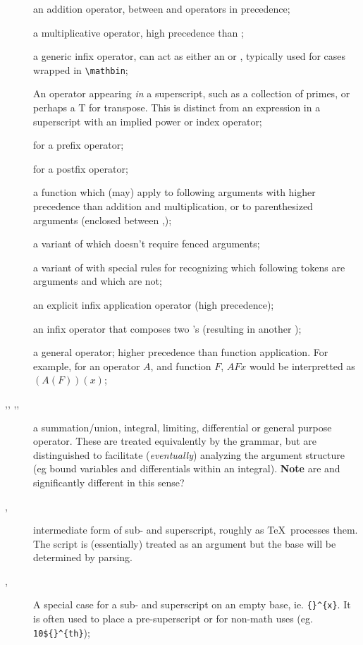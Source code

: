 \documentclass{book}
\begin{document}
\begin{description}
\item[] an addition operator, between  and  operators in
   precedence;
\item[] a multiplicative operator, high precedence than ;
\item[] a generic infix operator, can act as either an  or ,
   typically used for cases wrapped in \verb|\mathbin|;
\item[] An operator appearing \emph{in} a superscript, such as a collection of primes,
  or perhaps a T for transpose. This is distinct from an expression in a superscript with
  an implied power or index operator;

\item[] for a prefix operator;
\item[] for a postfix operator;

\item[] a function which (may) apply to following arguments with higher
   precedence than addition and multiplication, or to parenthesized arguments
   (enclosed between ,);
\item[] a variant of  which doesn't require fenced arguments;
\item[] a variant of  with special rules for
  recognizing which following tokens are arguments and which are not;
\item[] an explicit infix application operator (high precedence);
\item[] an infix operator that composes two 's
  (resulting in another );
\item[] a general operator; higher precedence than function application.
  For example, for an operator $A$, and function $F$, $A F x$ would be interpretted as $(A(F))(x)$;
\item[,, ,,]
  a summation/union, integral, limiting, differential or general purpose operator.
  These are treated equivalently by the grammar, but are distinguished to
 facilitate (\emph{eventually}) analyzing the argument structure (eg bound variables
  and differentials within an integral).
 \textbf{Note} are  and  significantly different in this sense?

\item[,] intermediate form of
  sub- and superscript, roughly as \TeX\ processes them.  The script is (essentially)
  treated as an argument but the base will be determined by parsing. 
\item[,] A special case for a sub- and
 superscript on an empty base, ie. \verb|{}^{x}|.  It is often used to place
  a pre-superscript or for non-math uses (eg. \verb|10${}^{th}|);
\end{description}
\end{document}
